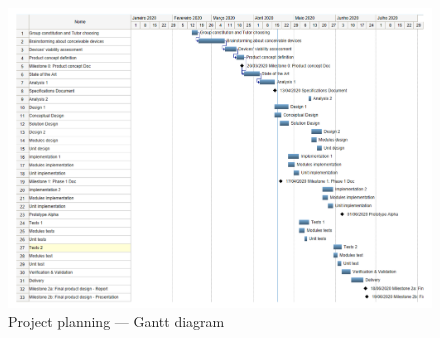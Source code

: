 % 
\begin{figure}
  \centering
  \includegraphics[page=1,width=1.0\textwidth]{sec/pdf/gantt-diag-orig.pdf} 
  \caption{Project planning --- Gantt diagram}%
  \label{fig:gantt-diag-orig}
\end{figure}
% 
